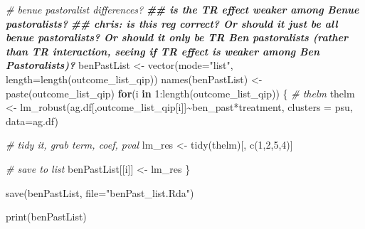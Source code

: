 \documentclass[
]{article}
\newenvironment{Shaded}{\begin{snugshade}}{\end{snugshade}}
\newcommand{\AttributeTok}[1]{\textcolor[rgb]{0.77,0.63,0.00}{#1}}
\newcommand{\CommentTok}[1]{\textcolor[rgb]{0.56,0.35,0.01}{\textit{#1}}}
\newcommand{\ControlFlowTok}[1]{\textcolor[rgb]{0.13,0.29,0.53}{\textbf{#1}}}
\newcommand{\DecValTok}[1]{\textcolor[rgb]{0.00,0.00,0.81}{#1}}
\newcommand{\DocumentationTok}[1]{\textcolor[rgb]{0.56,0.35,0.01}{\textbf{\textit{#1}}}}
\newcommand{\FunctionTok}[1]{\textcolor[rgb]{0.00,0.00,0.00}{#1}}
\newcommand{\NormalTok}[1]{#1}
\newcommand{\OtherTok}[1]{\textcolor[rgb]{0.56,0.35,0.01}{#1}}
\newcommand{\SpecialCharTok}[1]{\textcolor[rgb]{0.00,0.00,0.00}{#1}}
\newcommand{\StringTok}[1]{\textcolor[rgb]{0.31,0.60,0.02}{#1}}
\begin{document}
\begin{Shaded}
\begin{Highlighting}[]
\CommentTok{\# benue pastoralist differences?}
\DocumentationTok{\#\# is the TR effect weaker among Benue pastoralists?}
\DocumentationTok{\#\# chris: is this reg correct?  Or should it just be all benue pastoralists?  Or should it only be TR Ben pastoralists (rather than TR interaction, seeing if TR effect is weaker among Ben Pastoralists)?}
\NormalTok{benPastList }\OtherTok{\textless{}{-}} \FunctionTok{vector}\NormalTok{(}\AttributeTok{mode=}\StringTok{"list"}\NormalTok{, }\AttributeTok{length=}\FunctionTok{length}\NormalTok{(outcome\_list\_qip))}
\FunctionTok{names}\NormalTok{(benPastList) }\OtherTok{\textless{}{-}} \FunctionTok{paste}\NormalTok{(outcome\_list\_qip)}
\ControlFlowTok{for}\NormalTok{(i }\ControlFlowTok{in} \DecValTok{1}\SpecialCharTok{:}\FunctionTok{length}\NormalTok{(outcome\_list\_qip))}
\NormalTok{\{}
  \CommentTok{\# thelm}
\NormalTok{  thelm }\OtherTok{\textless{}{-}} \FunctionTok{lm\_robust}\NormalTok{(ag.df[,outcome\_list\_qip[i]]}\SpecialCharTok{\textasciitilde{}}\NormalTok{ben\_past}\SpecialCharTok{*}\NormalTok{treatment,}
                     \AttributeTok{clusters =}\NormalTok{ psu, }\AttributeTok{data=}\NormalTok{ag.df)}
  
  \CommentTok{\# tidy it, grab term, coef, pval}
\NormalTok{  lm\_res }\OtherTok{\textless{}{-}} \FunctionTok{tidy}\NormalTok{(thelm)[, }\FunctionTok{c}\NormalTok{(}\DecValTok{1}\NormalTok{,}\DecValTok{2}\NormalTok{,}\DecValTok{5}\NormalTok{,}\DecValTok{4}\NormalTok{)]}
  
  \CommentTok{\# save to list}
\NormalTok{  benPastList[[i]] }\OtherTok{\textless{}{-}}\NormalTok{ lm\_res}
\NormalTok{\}}

\FunctionTok{save}\NormalTok{(benPastList, }\AttributeTok{file=}\StringTok{"benPast\_list.Rda"}\NormalTok{)}
\end{Highlighting}
\end{Shaded}

\begin{Shaded}
\begin{Highlighting}[]
\FunctionTok{print}\NormalTok{(benPastList)}
\end{Highlighting}
\end{Shaded}
\end{document}
